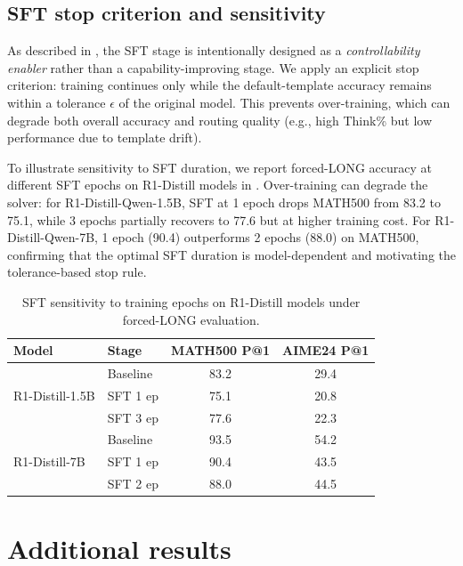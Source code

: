 \subsection{SFT stop criterion and sensitivity}
\label{sec:sft_sensitivity}

As described in , the SFT stage is intentionally designed as a \emph{controllability enabler} rather than a capability-improving stage. We apply an explicit stop criterion: training continues only while the default-template accuracy remains within a tolerance $\epsilon$ of the original model. This prevents over-training, which can degrade both overall accuracy and routing quality (e.g., high Think\% but low performance due to template drift).

To illustrate sensitivity to SFT duration, we report forced-LONG accuracy at different SFT epochs on R1-Distill models in . Over-training can degrade the solver: for R1-Distill-Qwen-1.5B, SFT at 1 epoch drops MATH500 from 83.2 to 75.1, while 3 epochs partially recovers to 77.6 but at higher training cost. For R1-Distill-Qwen-7B, 1 epoch (90.4) outperforms 2 epochs (88.0) on MATH500, confirming that the optimal SFT duration is model-dependent and motivating the tolerance-based stop rule.

\begin{table}[t]
\centering
\small
\caption{SFT sensitivity to training epochs on R1-Distill models under forced-LONG evaluation. 
}
\label{tab:sft_sensitivity}
\addtolength{\tabcolsep}{-4.5pt}
\begin{tabular}{l|l|cc}
\toprule
\textbf{Model} & \textbf{Stage} & \textbf{MATH500 P@1} & \textbf{AIME24 P@1} \\
\midrule
\multirow{3}{*}{R1-Distill-1.5B} & Baseline & 83.2 & 29.4 \\
& SFT 1 ep & 75.1 & 20.8 \\
& SFT 3 ep & 77.6 & 22.3 \\
\midrule
\multirow{3}{*}{R1-Distill-7B} & Baseline & 93.5 & 54.2 \\
& SFT 1 ep & 90.4 & 43.5 \\
& SFT 2 ep & 88.0 & 44.5 \\
\bottomrule
\end{tabular}
\end{table}

\section{Additional results}

